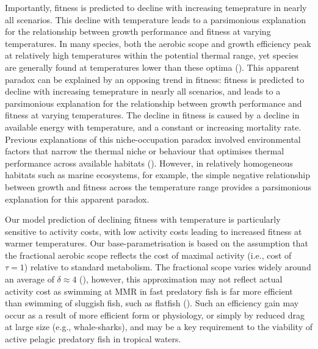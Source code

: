 \documentclass[a4paper, toc=index,abstract=true]{scrartcl}\usepackage[]{graphicx}\usepackage[]{color}
\begin{document}
\begin{spacing}{1.9}
Importantly, fitness is predicted to decline with increasing temeprature in nearly all scenarios. This decline with temperature leads to a parsimonious explanation for the relationship between growth performance and fitness at varying temperatures. In many species, both the aerobic scope and growth efficiency peak at relatively high temperatures within the potential thermal range, yet species are generally found at temperatures lower than these optima (\cite{magnuson_thermal_1997, claireaux_influence_2000}). This apparent paradox can be explained by an opposing trend in fitness: fitness is predicted to decline with increasing temeprature in nearly all scenarios, and leads to a parsimonious explanation for the relationship between growth performance and fitness at varying temperatures. The decline in fitness is caused by a decline in available energy with temperature, and a constant or increasing mortality rate. Previous explanations of this niche-occupation paradox involved environmental factors that narrow the thermal niche or behaviour that optimises thermal performance across available habitats (\cite{claireaux_influence_2000, magnuson_thermal_1997}). However, in relatively homogeneous habitats such as marine ecosystems, for example, the simple negative relationship between growth and fitness across the temperature range provides a parsimonious explanation for this apparent paradox. 

Our model prediction of declining fitness with temperature is
particularly sensitive to activity costs, with low activity costs
leading to increased fitness at warmer temperatures. Our
base-parametrisation is based on the assumption that the fractional
aerobic scope reflects the cost of maximal activity (i.e., cost of
$\tau=1$) relative to standard metabolism. The fractional scope varies
widely around an average of $\delta \approx 4$ (\cite[e.g.,
][]{killen_ecological_2016}), however, this approximation may not
reflect actual activity cost as swimming at MMR in fast predatory fish
is far more efficient than swimming of sluggish fish, such as flatfish
(\cite{priede_metabolic_1985}). Such an efficiency gain may occur as a result of more efficient form or physiology, or simply by reduced drag at large size (e.g., whale-sharks), and may be a key requirement to the viability of active pelagic predatory fish in tropical waters.


\end{spacing}
\end{document}
